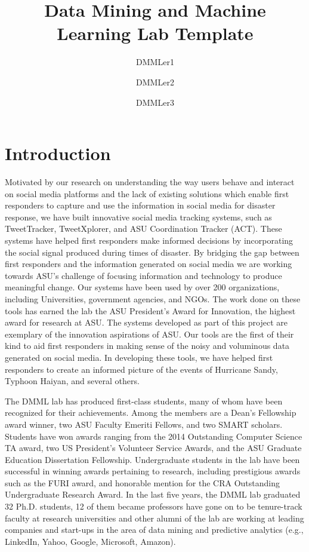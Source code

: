 \documentclass[11pt, a4paper, logo, copyright]{dmml}
\title{Data Mining and Machine Learning Lab Template}
\author[1 *]{DMMLer1}
\author[1]{DMMLer2}
\author[1]{DMMLer3}
\affil[1]{Arizona State University}
\begin{document}
\maketitle

\section{Introduction}

Motivated by our research on understanding the way users behave and interact on social media platforms and the lack of existing solutions which enable first responders to capture and use the information in social media for disaster response, we have built innovative social media tracking systems, such as TweetTracker, TweetXplorer, and ASU Coordination Tracker (ACT). These systems have helped first responders make informed decisions by incorporating the social signal produced during times of disaster. By bridging the gap between first responders and the information generated on social media we are working towards ASU's challenge of focusing information and technology to produce meaningful change. Our systems have been used by over 200 organizations, including Universities, government agencies, and NGOs. The work done on these tools has earned the lab the ASU President's Award for Innovation, the highest award for research at ASU. The systems developed as part of this project are exemplary of the innovation aspirations of ASU. Our tools are the first of their kind to aid first responders in making sense of the noisy and voluminous data generated on social media. In developing these tools, we have helped first responders to create an informed picture of the events of Hurricane Sandy, Typhoon Haiyan, and several others.

The DMML lab has produced first-class students, many of whom have been recognized for their achievements. Among the members are a Dean's Fellowship award winner, two ASU Faculty Emeriti Fellows, and two SMART scholars. Students have won awards ranging from the 2014 Outstanding Computer Science TA award, two US President's Volunteer Service Awards, and the ASU Graduate Education Dissertation Fellowship. Undergraduate students in the lab have been successful in winning awards pertaining to research, including prestigious awards such as the FURI award, and honorable mention for the CRA Outstanding Undergraduate Research Award. In the last five years, the DMML lab graduated 32 Ph.D. students, 12 of them became professors have gone on to be tenure-track faculty at research universities and other alumni of the lab are working at leading companies and start-ups in the area of data mining and predictive analytics (e.g., LinkedIn, Yahoo, Google, Microsoft, Amazon).
\end{document}
